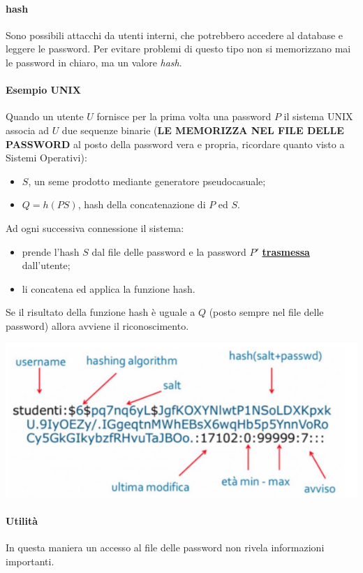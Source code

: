 \paragraph{hash} Sono possibili attacchi da utenti interni, che potrebbero accedere al database e leggere le password. Per evitare problemi di questo tipo non si memorizzano mai le password in chiaro, ma un valore \emph{hash}.
\paragraph{Esempio UNIX} Quando un utente $U$ fornisce per la prima volta una password $P$ il sistema UNIX associa ad $U$ due sequenze binarie (\textbf{LE MEMORIZZA NEL FILE DELLE PASSWORD} al posto della password vera e propria, ricordare quanto visto a Sistemi Operativi):
\begin{itemize}
    \item $S$, un seme prodotto mediante generatore pseudocasuale;
    \item $Q = h(PS)$, hash della concatenazione di $P$ ed $S$.
\end{itemize}
Ad ogni successiva connessione il sistema:
\begin{itemize}
	\item prende l'hash $S$ dal file delle password e la password $P'$ \textbf{\underline{trasmessa}} dall'utente;
	\item li concatena ed applica la funzione hash.
\end{itemize} 
Se il risultato della funzione hash è uguale a $Q$ (posto sempre nel file delle password) allora avviene il riconoscimento.
\pagebreak
\begin{center}
	\includegraphics[scale=.85]{images/34.PNG}
\end{center}
\paragraph{Utilità} In questa maniera un accesso al file delle password non rivela informazioni importanti.

